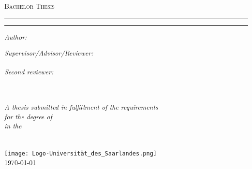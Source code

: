 \documentclass[
12pt, %
oneside, %
english, %
onehalfspacing, %
toctotoc, %
headsepline, %
chapterinoneline, %
]{MastersDoctoralThesis} %
\author{Daniel Gusenburger} %
\begin{document}
\frontmatter %

\pagestyle{plain} %


\begin{titlepage}
    \begin{center}
        {\scshape\LARGE \univname\par}\vspace{1cm} %
        \textsc{\Large Bachelor Thesis}\\[0.5cm] %
        \hrule
        \vspace{0.5cm}
        {\huge \bfseries \ttitle\par}
        \vspace{0.5cm} %
        \hrule
        \vspace{1.5cm}

        \begin{minipage}[t]{0.4\textwidth}
            \begin{flushleft} \large
                \emph{Author:}\\
                \authorname
            \end{flushleft}
        \end{minipage}
        \begin{minipage}[t]{0.5\textwidth}
            \begin{flushright} \large
                \emph{Supervisor/Advisor/Reviewer:} \\
                \supname\\[0.3cm]
                \emph{Second reviewer:}\\
                \examname\\
            \end{flushright}
        \end{minipage}\\[1cm]
        \large \textit{A thesis submitted in fulfillment of the requirements\\ for the degree of \degreename}\\[0.3cm] %
        \textit{in the}\\[0.3cm]
        \groupname\\\deptname\\[1cm] %
        \texttt{[image: Logo-Universität\_des\_Saarlandes.png]} \\[1cm]
        \vfill
        {\large \today}
    \end{center}
\end{titlepage}
\end{document}

